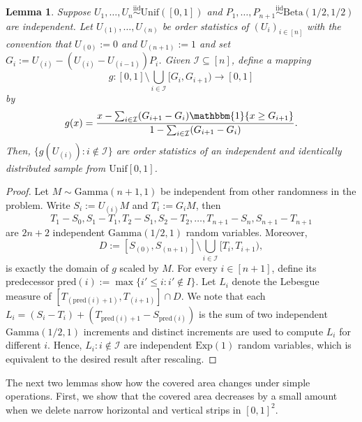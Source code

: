 \documentclass[11pt]{article}
\newtheorem{lemma}[thm]{Lemma}
\newcommand{\iid}{\stackrel{\mathrm{iid}}\sim}
\begin{document}
\begin{lemma}
\label{Lemma:CarveOut}
    Suppose $U_1,\ldots,U_n\iid \mathrm{Unif}([0,1])$ and $P_1,\ldots,P_{n+1}\iid \mathrm{Beta}(1/2,1/2)$ are independent. Let $U_{(1)},\ldots,U_{(n)}$ be order statistics of $(U_i)_{i\in[n]}$ with the convention that $U_{(0)}:=0$ and $U_{(n+1)}:=1$ and set $G_i := U_{(i)} - (U_{(i)} - U_{(i-1)})P_i$. Given $\mathcal{I}\subseteq[n]$, define a mapping 
    \[
    g:[0,1]\setminus \bigcup_{i\in \mathcal{I}} [G_i, G_{i+1}) \to[0,1] 
    \]
    by 
    \[
    g(x) = \frac{x - \sum_{i\in\mathcal{I}}(G_{i+1}-G_i)\mathbbm{1}\{x\geq G_{i+1}\}}{1-\sum_{i\in\mathcal{I}}(G_{i+1}-G_i)}.
    \]
    Then, $\{g(U_{(i)}):i\notin \mathcal{I}\}$ are order statistics of an independent and identically distributed sample from $\mathrm{Unif}[0,1]$.
\end{lemma}
\begin{proof}
    Let $M\sim \mathrm{Gamma}(n+1,1)$ be independent from other randomness in the problem. Write $S_i := U_{(i)} M$ and $T_i:=G_i M$, then 
    \[  
    T_1 - S_0, S_1 - T_1, T_2 - S_1, S_2 - T_2, \ldots, T_{n+1}-S_n, S_{n+1}-T_{n+1}
    \]
    are $2n+2$ independent $\mathrm{Gamma}(1/2,1)$ random variables. Moreover,
    \[  
    D := [S_{(0)}, S_{(n+1)}] \setminus \bigcup_{i\in\mathcal{I}} [T_i, T_{i+1}),
    \]
    is exactly the domain of $g$ scaled by $M$. For every $i\in[n+1]$, define its predecessor $\mathrm{pred}(i):=\max\{i'\leq i: i'\notin I\}$. Let $L_i$ denote the Lebesgue measure of $[T_{(\mathrm{pred}(i)+1)}, T_{(i+1)}]\cap D$. We note that each $L_i = (S_i - T_i) + (T_{\mathrm{pred}(i)+1} - S_{\mathrm{pred}(i)})$ is the sum of two independent $\mathrm{Gamma}(1/2,1)$ increments and distinct increments are used to compute $L_i$ for different $i$. Hence,  $L_i: i\notin \mathcal{I}$ are independent $\mathrm{Exp}(1)$ random variables, which is equivalent to the desired result after rescaling.
\end{proof}

The next two lemmas show how the covered area changes under simple operations. First, we show that the covered area decreases by a small amount when we delete narrow horizontal and vertical strips in $[0,1]^2$.
\end{document}
